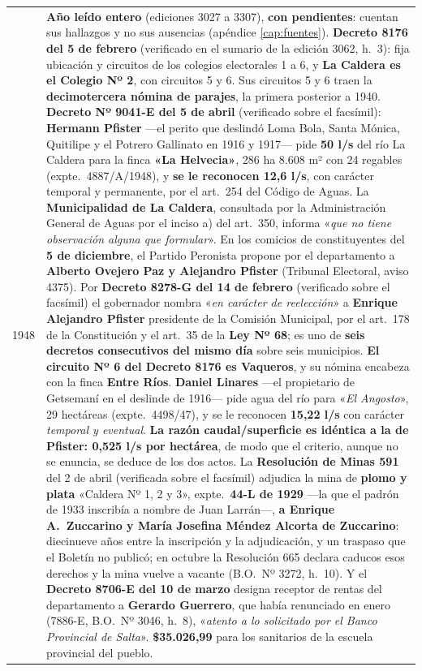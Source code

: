 \begin{longtable}{@{}p{2.7cm}p{10.3cm}@{}}
1948 & \textbf{Año leído entero} (ediciones 3027 a 3307), \textbf{con pendientes}: cuentan sus hallazgos y no sus ausencias (apéndice \ref{cap:fuentes}). \textbf{Decreto 8176 del 5 de febrero} (verificado en el sumario de la edición 3062, h.\ 3): fija ubicación y circuitos de los colegios electorales 1 a 6, y \textbf{La Caldera es el Colegio Nº 2}, con circuitos 5 y 6. Sus circuitos 5 y 6 traen la \textbf{decimotercera nómina de parajes}, la primera posterior a 1940. \textbf{Decreto Nº 9041-E del 5 de abril} (verificado sobre el facsímil): \textbf{Hermann Pfister} ---el perito que deslindó Loma Bola, Santa Mónica, Quitilipe y el Potrero Gallinato en 1916 y 1917--- pide \textbf{50 l/s} del río La Caldera para la finca \textbf{«La Helvecia»}, 286 ha 8.608 m² con 24 regables (expte.\ 4887/A/1948), y \textbf{se le reconocen 12,6 l/s}, con carácter temporal y permanente, por el art.\ 254 del Código de Aguas. La \textbf{Municipalidad de La Caldera}, consultada por la Administración General de Aguas por el inciso a) del art.\ 350, informa «\textit{que no tiene observación alguna que formular}». En los comicios de constituyentes del \textbf{5 de diciembre}, el Partido Peronista propone por el departamento a \textbf{Alberto Ovejero Paz y Alejandro Pfister} (Tribunal Electoral, aviso 4375). Por \textbf{Decreto 8278-G del 14 de febrero} (verificado sobre el facsímil) el gobernador nombra «\textit{en carácter de reelección}» a \textbf{Enrique Alejandro Pfister} presidente de la Comisión Municipal, por el art.\ 178 de la Constitución y el art.\ 35 de la \textbf{Ley Nº 68}; es uno de \textbf{seis decretos consecutivos del mismo día} sobre seis municipios. \textbf{El circuito Nº 6 del Decreto 8176 es Vaqueros}, y su nómina encabeza con la finca \textbf{Entre Ríos}. \textbf{Daniel Linares} ---el propietario de Getsemaní en el deslinde de 1916--- pide agua del río para «\textit{El Angosto}», 29 hectáreas (expte.\ 4498/47), y se le reconocen \textbf{15,22 l/s} con carácter \textit{temporal y eventual}. \textbf{La razón caudal/superficie es idéntica a la de Pfister: 0,525 l/s por hectárea}, de modo que el criterio, aunque no se enuncia, se deduce de los dos actos. La \textbf{Resolución de Minas 591} del 2 de abril (verificada sobre el facsímil) adjudica la mina de \textbf{plomo y plata} «Caldera Nº 1, 2 y 3», expte.\ \textbf{44-L de 1929} ---la que el padrón de 1933 inscribía a nombre de Juan Larrán---, \textbf{a Enrique A.\ Zuccarino y María Josefina Méndez Alcorta de Zuccarino}: diecinueve años entre la inscripción y la adjudicación, y un traspaso que el Boletín no publicó; en octubre la Resolución 665 declara caducos esos derechos y la mina vuelve a vacante (B.O.\ Nº 3272, h.\ 10). Y el \textbf{Decreto 8706-E del 10 de marzo} designa receptor de rentas del departamento a \textbf{Gerardo Guerrero}, que había renunciado en enero (7886-E, B.O.\ Nº 3046, h.\ 8), «\textit{atento a lo solicitado por el Banco Provincial de Salta}». \textbf{\$35.026,99} para los sanitarios de la escuela provincial del pueblo. \\

\end{longtable}
